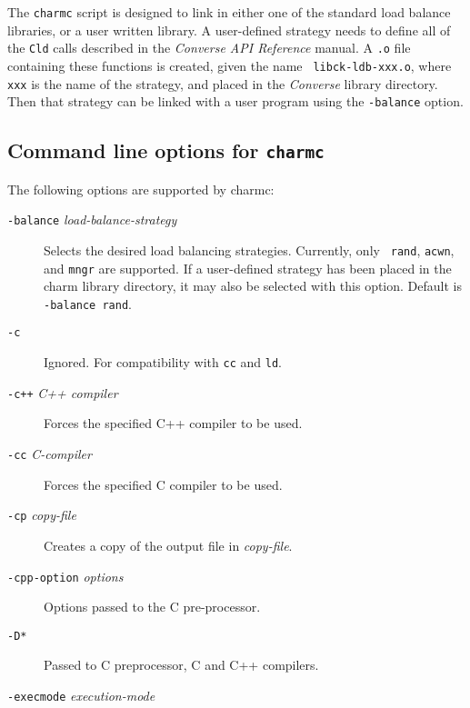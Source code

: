 The {\tt charmc} script is designed to link in either one of the
standard load balance libraries, or a user written library.  A
user-defined strategy needs to define all of the {\tt Cld} calls
described in the {\em Converse API Reference} manual.  A {\tt .o} file
containing these functions is created, given the name {\tt
libck-ldb-xxx.o}, where {\tt xxx} is the name of the strategy, and
placed in the {\em Converse} library directory.  Then that strategy
can be linked with a user program using the {\tt -balance} option.

\subsection{Command line options for {\tt charmc}}
The following options are supported by charmc:
\begin{description}

\item[{\tt -balance} {\em load-balance-strategy}]

Selects the desired load balancing strategies.  Currently, only {\tt
rand}, {\tt acwn}, and {\tt mngr} are supported. If a user-defined
strategy has been placed in the charm library directory, it may also
be selected with this option.  Default is {\tt -balance rand}.
	
\item[{\tt -c}]

Ignored.  For compatibility with {\tt cc} and {\tt ld}.

\item[{\tt -c++} {\em C++ compiler}]

Forces the specified C++ compiler to be used.

\item[{\tt -cc} {\em C-compiler}]

Forces the specified C compiler to be used.

\item[{\tt -cp} {\em copy-file}]

Creates a copy of the output file in {\em copy-file}.

\item[{\tt -cpp-option} {\em options}]

Options passed to the C pre-processor.

\item[{\tt -D*}]

Passed to C preprocessor, C and C++ compilers.

\item[{\tt -execmode} {\em execution-mode}]


\end{description}
